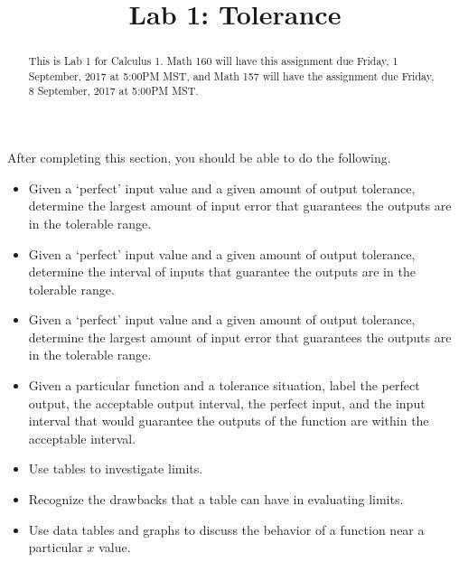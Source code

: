 \documentclass{ximera}
\title{Lab 1: Tolerance}
\begin{document}
\begin{abstract}
This is Lab 1 for Calculus 1. Math 160 will have this assignment due Friday, 1 September, 2017 at 5:00PM MST, and Math 157 will have the assignment due Friday, 8 September, 2017  at 5:00PM MST.
\end{abstract}

\maketitle

\begin{sectionOutcomes}
After completing this section, you should be able to do the following.

\begin{itemize}
	\item Given a `perfect' input value and a given amount of output tolerance, determine the largest amount of input error that guarantees the outputs are in the tolerable range. 
 	\item Given a `perfect' input value and a given amount of output tolerance, determine the interval of inputs that guarantee the outputs are in the tolerable range.
 	\item Given a `perfect' input value and a given amount of output tolerance, determine the largest amount of input error that guarantees the outputs are in the tolerable range. 
    \item Given a particular function and a tolerance situation, label the perfect output, the acceptable output interval, the perfect input, and the input interval that would guarantee the outputs of the function are within the acceptable interval.
    \item Use tables to investigate limits.
    \item Recognize the drawbacks that a table can have in evaluating limits.
    \item Use data tables and graphs to discuss the behavior of a function near a particular $x$ value. 
\end{itemize}
\end{sectionOutcomes}
\end{document}
